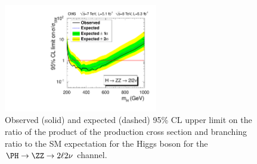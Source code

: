 \begin{figure}[htbp]
\begin{center}
\includegraphics[width=0.6\textwidth]{figures/ZZ2l2nuLimit.pdf}
\caption{Observed (solid) and expected
(dashed) 95\% CL upper limit on the ratio of the product of the  production cross
section and branching ratio to the SM expectation for the Higgs boson for the $\PH \to \ZZ \to 2\ell 2\nu$ channel.
} 
\label{fig:limits_SM}
\end{center}
\end{figure}
